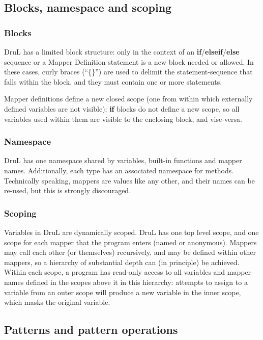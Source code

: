 \subsection{Blocks, namespace and scoping}

\subsubsection{Blocks}

DruL has a limited block structure: only in the context of an \textbf{if}/\textbf{elseif}/\textbf{else} sequence or a Mapper Definition statement is a new block needed or allowed.  In these cases, curly braces (``\{\}'') are used to delimit the statement-sequence that falls within the block, and they must contain one or more statements.

Mapper definitions define a new closed scope (one from within which externally defined variables are not visible); \textbf{if} blocks do not define a new scope, so all variables used within them are visible to the enclosing  block, and vise-versa.

\subsubsection{Namespace}

DruL has one namespace shared by variables, built-in functions and
mapper names. Additionally, each type has an associated namespace for methods.  Technically speaking, mappers are values like any other, and their names can be re-used, but this is strongly discouraged.

\subsubsection{Scoping}

Variables in DruL are dynamically scoped.
DruL has one top level scope, and one scope for each mapper that the program enters
(named or anonymous). Mappers may call each other (or themselves) recursively, and may be defined within other mappers, so a hierarchy of substantial depth can (in principle) be achieved.
Within each scope, a program has read-only access to all variables and mapper names
defined in the scopes above it in this hierarchy: attempts to assign to a variable from an outer scope
will produce a new variable in the inner scope, which masks the original variable.

\subsection{Patterns and pattern operations}

